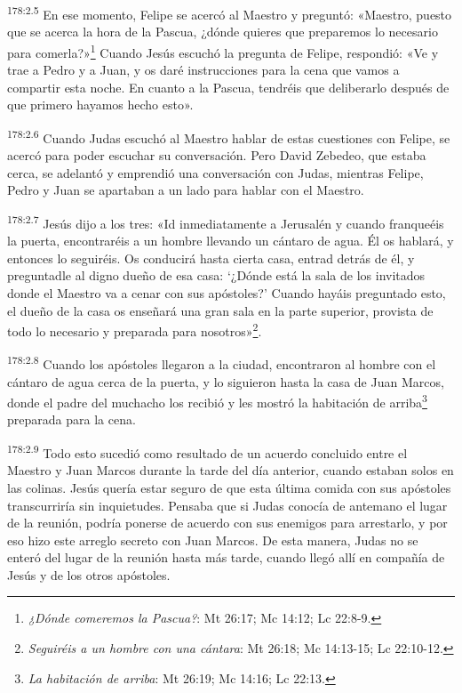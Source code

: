 \par 
\textsuperscript{178:2.5} En ese momento, Felipe se acercó al Maestro y preguntó: «Maestro, puesto que se acerca la hora de la Pascua, ¿dónde quieres que preparemos lo necesario para comerla?»\footnote{\textit{¿Dónde comeremos la Pascua?}: Mt 26:17; Mc 14:12; Lc 22:8-9.} Cuando Jesús escuchó la pregunta de Felipe, respondió: «Ve y trae a Pedro y a Juan, y os daré instrucciones para la cena que vamos a compartir esta noche. En cuanto a la Pascua, tendréis que deliberarlo después de que primero hayamos hecho esto».

\par 
\textsuperscript{178:2.6} Cuando Judas escuchó al Maestro hablar de estas cuestiones con Felipe, se acercó para poder escuchar su conversación. Pero David Zebedeo, que estaba cerca, se adelantó y emprendió una conversación con Judas, mientras Felipe, Pedro y Juan se apartaban a un lado para hablar con el Maestro.

\par 
\textsuperscript{178:2.7} Jesús dijo a los tres: «Id inmediatamente a Jerusalén y cuando franqueéis la puerta, encontraréis a un hombre llevando un cántaro de agua. Él os hablará, y entonces lo seguiréis. Os conducirá hasta cierta casa, entrad detrás de él, y preguntadle al digno dueño de esa casa: `¿Dónde está la sala de los invitados donde el Maestro va a cenar con sus apóstoles?' Cuando hayáis preguntado esto, el dueño de la casa os enseñará una gran sala en la parte superior, provista de todo lo necesario y preparada para nosotros»\footnote{\textit{Seguiréis a un hombre con una cántara}: Mt 26:18; Mc 14:13-15; Lc 22:10-12.}.

\par 
\textsuperscript{178:2.8} Cuando los apóstoles llegaron a la ciudad, encontraron al hombre con el cántaro de agua cerca de la puerta, y lo siguieron hasta la casa de Juan Marcos, donde el padre del muchacho los recibió y les mostró la habitación de arriba\footnote{\textit{La habitación de arriba}: Mt 26:19; Mc 14:16; Lc 22:13.} preparada para la cena.

\par 
\textsuperscript{178:2.9} Todo esto sucedió como resultado de un acuerdo concluido entre el Maestro y Juan Marcos durante la tarde del día anterior, cuando estaban solos en las colinas. Jesús quería estar seguro de que esta última comida con sus apóstoles transcurriría sin inquietudes. Pensaba que si Judas conocía de antemano el lugar de la reunión, podría ponerse de acuerdo con sus enemigos para arrestarlo, y por eso hizo este arreglo secreto con Juan Marcos. De esta manera, Judas no se enteró del lugar de la reunión hasta más tarde, cuando llegó allí en compañía de Jesús y de los otros apóstoles.

